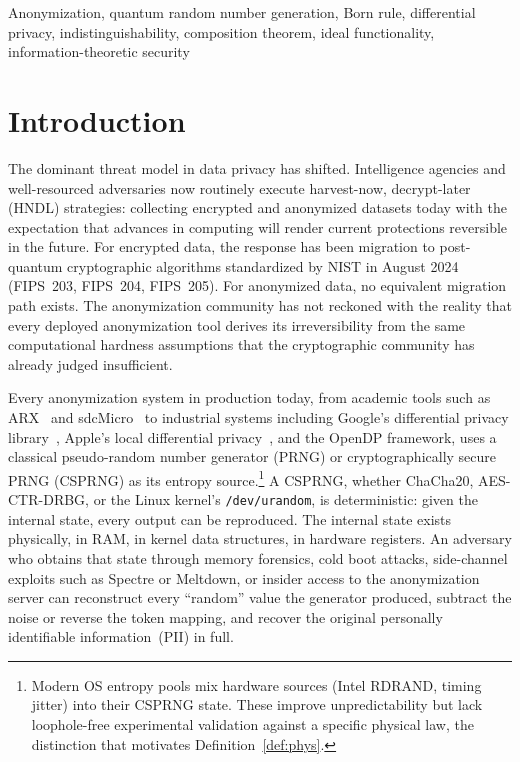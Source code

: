 \documentclass[journal]{IEEEtran}
\begin{document}
\begin{IEEEkeywords}
Anonymization, quantum random number generation, Born rule, differential privacy, indistinguishability, composition theorem, ideal functionality, information-theoretic security
\end{IEEEkeywords}

\section{Introduction}
\label{sec:intro}

The dominant threat model in data privacy has shifted. Intelligence agencies and well-resourced adversaries now routinely execute harvest-now, decrypt-later (HNDL) strategies: collecting encrypted and anonymized datasets today with the expectation that advances in computing will render current protections reversible in the future. For encrypted data, the response has been migration to post-quantum cryptographic algorithms standardized by NIST in August 2024 (FIPS~203, FIPS~204, FIPS~205). For anonymized data, no equivalent migration path exists. The anonymization community has not reckoned with the reality that every deployed anonymization tool derives its irreversibility from the same computational hardness assumptions that the cryptographic community has already judged insufficient.

Every anonymization system in production today, from academic tools such as ARX~\cite{prasser2014arx} and sdcMicro~\cite{templ2017sdc} to industrial systems including Google's differential privacy library~\cite{wilson2020dpsql}, Apple's local differential privacy~\cite{apple2017dp}, and the OpenDP framework, uses a classical pseudo-random number generator (PRNG) or cryptographically secure PRNG (CSPRNG) as its entropy source.\footnote{Modern OS entropy pools mix hardware sources (Intel RDRAND, timing jitter) into their CSPRNG state. These improve unpredictability but lack loophole-free experimental validation against a specific physical law, the distinction that motivates Definition~\ref{def:phys}.} A CSPRNG, whether ChaCha20, AES-CTR-DRBG, or the Linux kernel's \texttt{/dev/urandom}, is deterministic: given the internal state, every output can be reproduced. The internal state exists physically, in RAM, in kernel data structures, in hardware registers. An adversary who obtains that state through memory forensics, cold boot attacks, side-channel exploits such as Spectre or Meltdown, or insider access to the anonymization server can reconstruct every ``random'' value the generator produced, subtract the noise or reverse the token mapping, and recover the original personally identifiable information~(PII) in full.
\end{document}
